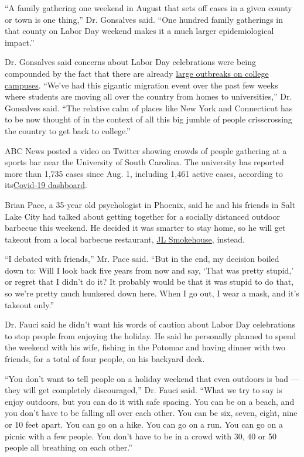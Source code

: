 ``A family gathering one weekend in August that sets off cases in a
given county or town is one thing,'' Dr. Gonsalves said. ``One hundred
family gatherings in that county on Labor Day weekend makes it a much
larger epidemiological impact.''

Dr. Gonsalves said concerns about Labor Day celebrations were being
compounded by the fact that there are already
\href{https://www.nytimes3xbfgragh.onion/interactive/2020/us/covid-college-cases-tracker.html}{large
outbreaks on college campuses}. ``We've had this gigantic migration
event over the past few weeks where students are moving all over the
country from homes to universities,'' Dr. Gonsalves said. ``The relative
calm of places like New York and Connecticut has to be now thought of in
the context of all this big jumble of people crisscrossing the country
to get back to college.''

ABC News posted a video on Twitter showing crowds of people gathering at
a sports bar near the University of South Carolina. The university has
reported more than 1,735 cases since Aug. 1, including 1,461 active
cases, according to
its\href{https://www.sc.edu/safety/coronavirus/dashboard/index.php}{Covid-19
dashboard}.

Brian Pace, a 35-year old psychologist in Phoenix, said he and his
friends in Salt Lake City had talked about getting together for a
socially distanced outdoor barbecue this weekend. He decided it was
smarter to stay home, so he will get takeout from a local barbecue
restaurant, \href{http://www.jlsmokehouse.com/}{JL Smokehouse}, instead.

``I debated with friends,'' Mr. Pace said. ``But in the end, my decision
boiled down to: Will I look back five years from now and say, `That was
pretty stupid,' or regret that I didn't do it? It probably would be that
it was stupid to do that, so we're pretty much hunkered down here. When
I go out, I wear a mask, and it's takeout only.''

Dr. Fauci said he didn't want his words of caution about Labor Day
celebrations to stop people from enjoying the holiday. He said he
personally planned to spend the weekend with his wife, fishing in the
Potomac and having dinner with two friends, for a total of four people,
on his backyard deck.

``You don't want to tell people on a holiday weekend that even outdoors
is bad --- they will get completely discouraged,'' Dr. Fauci said.
``What we try to say is enjoy outdoors, but you can do it with safe
spacing. You can be on a beach, and you don't have to be falling all
over each other. You can be six, seven, eight, nine or 10 feet apart.
You can go on a hike. You can go on a run. You can go on a picnic with a
few people. You don't have to be in a crowd with 30, 40 or 50 people all
breathing on each other.''

